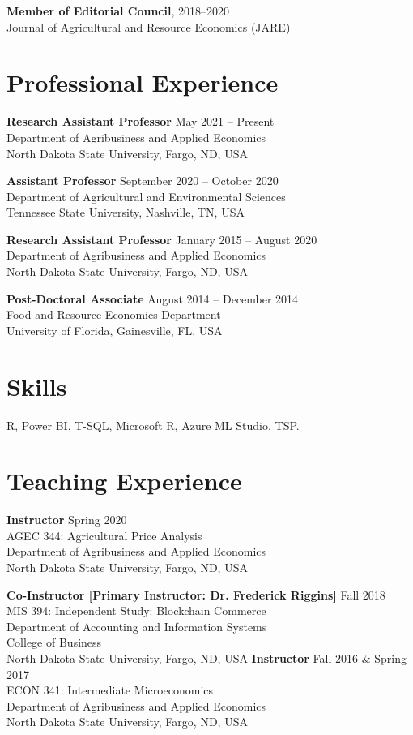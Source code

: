 \documentclass[margin,line]{res}
\begin{document}
\begin{resume}
{\bf Member of Editorial Council}, \hfill{2018--2020}\\
Journal of Agricultural and Resource Economics (JARE) 
\section{\sc Professional Experience}
{\bf Research Assistant Professor} \hfill{May 2021 -- Present} \\
Department of Agribusiness and Applied Economics \\
North Dakota State University, Fargo, ND, USA 

{\bf Assistant Professor} \hfill{September 2020 -- October 2020} \\
Department of Agricultural and Environmental Sciences \\
Tennessee State University, Nashville, TN, USA 

{\bf Research Assistant Professor} \hfill{January 2015 -- August 2020} \\
Department of Agribusiness and Applied Economics \\
North Dakota State University, Fargo, ND, USA 

{\bf Post-Doctoral Associate} \hfill{August 2014 -- December 2014} \\
Food and Resource Economics Department \\
University of Florida, Gainesville, FL, USA 


\section{\sc Skills}
R, Power BI, T-SQL, Microsoft R, Azure ML Studio, TSP. %

\section{\sc Teaching Experience}
{\bf Instructor } \hfill{Spring 2020} \\
AGEC 344: Agricultural Price Analysis \\
Department of Agribusiness and Applied Economics \\
North Dakota State University, Fargo, ND, USA

{\bf Co-Instructor [Primary Instructor: Dr. Frederick Riggins]} \hfill{Fall 2018} \\
MIS 394: Independent Study: Blockchain Commerce \\
Department of Accounting and Information Systems \\
College of Business \\
North Dakota State University, Fargo, ND, USA
\newpage
{\bf Instructor} \hfill{Fall 2016 \& Spring 2017} \\
ECON 341: Intermediate Microeconomics \\
Department of Agribusiness and Applied Economics \\
North Dakota State University, Fargo, ND, USA


\end{resume}
\end{document}
